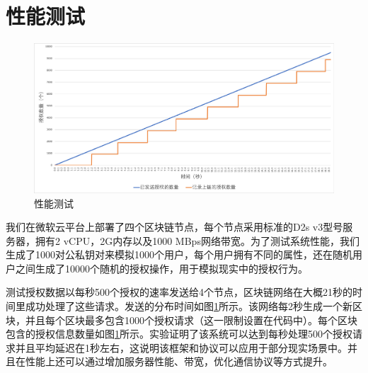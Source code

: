 \section{性能测试}

\begin{figure}
\centering
\includegraphics[width=12cm, keepaspectratio]{figures/performance.png}
\caption{性能测试}
\label{fig:performance}
\end{figure}

我们在微软云平台上部署了四个区块链节点，每个节点采用标准的D2s v3型号服务器，拥有2 vCPU，2G内存以及1000 MBps网络带宽。为了测试系统性能，我们生成了1000对公私钥对来模拟1000个用户，每个用户拥有不同的属性，还在随机用户之间生成了10000个随机的授权操作，用于模拟现实中的授权行为。

测试授权数据以每秒500个授权的速率发送给4个节点，区块链网络在大概21秒的时间里成功处理了这些请求。发送的分布时间如图\ref{fig:performance}所示。该网络每2秒生成一个新区块，并且每个区块最多包含1000个授权请求（这一限制设置在代码中）。每个区块包含的授权信息数量如图\ref{fig:performance}所示。实验证明了该系统可以达到每秒处理500个授权请求并且平均延迟在1秒左右，这说明该框架和协议可以应用于部分现实场景中。并且在性能上还可以通过增加服务器性能、带宽，优化通信协议等方式提升。